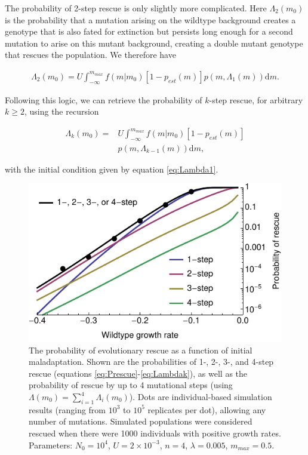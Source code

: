 \documentclass[9pt,twocolumn,twoside,lineno]{gsajnl}
\begin{document}
The probability of 2-step rescue is only slightly more complicated.
Here $\Lambda_2(m_0)$ is the probability that a mutation arising on the wildtype background creates a genotype that is also fated for extinction but persists long enough for a second mutation to arise on this mutant background, creating a double mutant genotype that rescues the population.
We therefore have

\begin{equation}\label{eq:Lambda2}
\begin{aligned}
\Lambda_2(m_0) = U \int_{-\infty}^{m_{max}} f(m|m_0) \left[ 1 - p_{est}(m) \right] p(m,\Lambda_{1}(m)) \mathrm{d}m.
\end{aligned}
\end{equation}

Following this logic, we can retrieve the probability of $k$-step rescue, for arbitrary $k\geq2$,  using the recursion

\begin{equation}\label{eq:Lambdak}
\begin{aligned}
\Lambda_k(m_0) =& U \int_{-\infty}^{m_{max}} f(m|m_0) \left[ 1 - p_{est}(m) \right] \\
                       & p(m,\Lambda_{k-1}(m)) \mathrm{d}m,
\end{aligned}
\end{equation}

\noindent with the initial condition given by equation \ref{eq:Lambda1}.

\begin{figure}[htb]
\centering
\includegraphics[width=\linewidth]{../IMAGES/4stepNormalU_sims.pdf}
\caption{
The probability of evolutionary rescue as a function of initial maladaptation.
Shown are the probabilities of 1-, 2-, 3-, and 4-step rescue (equations \ref{eq:Prescue}-\ref{eq:Lambdak}), as well as the probability of rescue by up to 4 mutational steps (using $\Lambda(m_0) = \sum_{i=1}^4 \Lambda_i(m_0)$).
Dots are individual-based simulation results (ranging from $10^3$ to $10^5$ replicates per dot), allowing any number of mutations.
Simulated populations were considered rescued when there were 1000 individuals with positive growth rates.
Parameters: $N_0=10^4$, $U=2\times10^{-3}$, $n=4$, $\lambda=0.005$, $m_{max}=0.5$.
}%
\label{fig:1vs2m0}
\end{figure}
\end{document}
